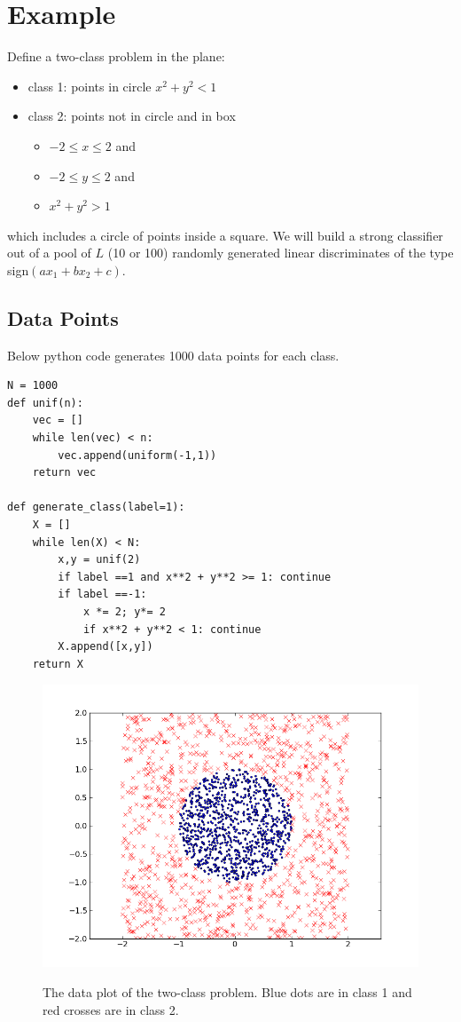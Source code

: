 \documentclass[]{article}  %
\begin{document}
\section{Example}

Define a two-class problem in the plane:
\begin{itemize}
\item class 1: points in circle $x^2+y^2 < 1$

\item class 2: points not in circle and in box 
\begin{itemize}
\item $-2\leq x \leq 2 $ and
\item $-2 \leq y \leq 2 $ and
\item$x^2 + y^2 > 1$ 
\end{itemize}
\end{itemize}

which includes a circle of points inside a square. We will build a strong classifier out of a pool of $L$ (10 or 100) randomly generated linear discriminates of the type sign$(ax_1+bx_2+c)$. 

\subsection{Data Points}

Below python code generates 1000 data points for each class.
\begin{verbatim}
N = 1000
def unif(n):
    vec = []
    while len(vec) < n:
        vec.append(uniform(-1,1))
    return vec

def generate_class(label=1):
    X = []
    while len(X) < N:
        x,y = unif(2)
        if label ==1 and x**2 + y**2 >= 1: continue
        if label ==-1:
            x *= 2; y*= 2
            if x**2 + y**2 < 1: continue
        X.append([x,y])
    return X
\end{verbatim}

\begin{figure}[h]
\begin{center}
\includegraphics[scale=.6]{plane.png}\label{fig:axis}
\end{center}
\caption{The data plot of the two-class problem. Blue dots are in class 1 and red crosses are in class 2. }
\end{figure}%
\end{document}
